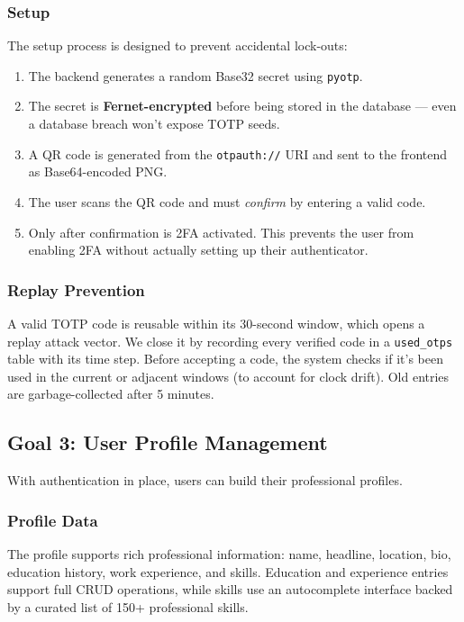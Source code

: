 \subsubsection{Setup}

The setup process is designed to prevent accidental lock-outs:

\begin{enumerate}
    \item The backend generates a random Base32 secret using \texttt{pyotp}.
    \item The secret is \textbf{Fernet-encrypted} before being stored in the database — even a database breach won't expose TOTP seeds.
    \item A QR code is generated from the \texttt{otpauth://} URI and sent to the frontend as Base64-encoded PNG.
    \item The user scans the QR code and must \textit{confirm} by entering a valid code.
    \item Only after confirmation is 2FA activated. This prevents the user from enabling 2FA without actually setting up their authenticator.
\end{enumerate}

\subsubsection{Replay Prevention}

A valid TOTP code is reusable within its 30-second window, which opens a replay attack vector. We close it by recording every verified code in a \texttt{used\_otps} table with its time step. Before accepting a code, the system checks if it's been used in the current or adjacent windows (to account for clock drift). Old entries are garbage-collected after 5 minutes.

\subsection{Goal 3: User Profile Management}

With authentication in place, users can build their professional profiles.

\subsubsection{Profile Data}

The profile supports rich professional information: name, headline, location, bio, education history, work experience, and skills. Education and experience entries support full CRUD operations, while skills use an autocomplete interface backed by a curated list of 150+ professional skills.

